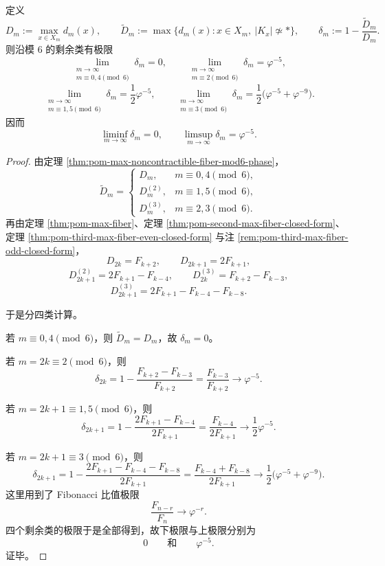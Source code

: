 \begin{theorem}\label{thm:xi-time-part62d-max-noncontractible-fiber-gap-four-constants}
定义
\[
D_m:=\max_{x\in X_m}d_m(x),
\qquad
\widetilde D_m:=\max\{d_m(x):x\in X_m,\ |K_x|\not\simeq *\},
\qquad
\delta_m:=1-\frac{\widetilde D_m}{D_m}.
\]
则沿模 \(6\) 的剩余类有极限
\[
\lim_{\substack{m\to\infty\\ m\equiv 0,4\!\!\!\!\pmod 6}}\delta_m=0,
\qquad
\lim_{\substack{m\to\infty\\ m\equiv 2\!\!\!\!\pmod 6}}\delta_m=\varphi^{-5},
\]
\[
\lim_{\substack{m\to\infty\\ m\equiv 1,5\!\!\!\!\pmod 6}}\delta_m=\frac{1}{2}\varphi^{-5},
\qquad
\lim_{\substack{m\to\infty\\ m\equiv 3\!\!\!\!\pmod 6}}\delta_m=\frac{1}{2}\bigl(\varphi^{-5}+\varphi^{-9}\bigr).
\]
因而
\[
\liminf_{m\to\infty}\delta_m=0,
\qquad
\limsup_{m\to\infty}\delta_m=\varphi^{-5}.
\]
\end{theorem}
\begin{proof}
由定理 \ref{thm:pom-max-noncontractible-fiber-mod6-phase}，
\[
\widetilde D_m=
\begin{cases}
D_m, & m\equiv 0,4\pmod 6,\\[2pt]
D_m^{(2)}, & m\equiv 1,5\pmod 6,\\[2pt]
D_m^{(3)}, & m\equiv 2,3\pmod 6.
\end{cases}
\]
再由定理 \ref{thm:pom-max-fiber}、定理 \ref{thm:pom-second-max-fiber-closed-form}、定理 \ref{thm:pom-third-max-fiber-even-closed-form} 与注 \ref{rem:pom-third-max-fiber-odd-closed-form}，
\[
D_{2k}=F_{k+2},
\qquad
D_{2k+1}=2F_{k+1},
\]
\[
D_{2k+1}^{(2)}=2F_{k+1}-F_{k-4},
\qquad
D_{2k}^{(3)}=F_{k+2}-F_{k-3},
\]
\[
D_{2k+1}^{(3)}=2F_{k+1}-F_{k-4}-F_{k-8}.
\]

于是分四类计算。

若 \(m\equiv 0,4\pmod 6\)，则 \(\widetilde D_m=D_m\)，故 \(\delta_m=0\)。

若 \(m=2k\equiv 2\pmod 6\)，则
\[
\delta_{2k}=1-\frac{F_{k+2}-F_{k-3}}{F_{k+2}}
=\frac{F_{k-3}}{F_{k+2}}
\longrightarrow \varphi^{-5}.
\]

若 \(m=2k+1\equiv 1,5\pmod 6\)，则
\[
\delta_{2k+1}
=1-\frac{2F_{k+1}-F_{k-4}}{2F_{k+1}}
=\frac{F_{k-4}}{2F_{k+1}}
\longrightarrow \frac{1}{2}\varphi^{-5}.
\]

若 \(m=2k+1\equiv 3\pmod 6\)，则
\[
\delta_{2k+1}
=1-\frac{2F_{k+1}-F_{k-4}-F_{k-8}}{2F_{k+1}}
=\frac{F_{k-4}+F_{k-8}}{2F_{k+1}}
\longrightarrow \frac{1}{2}\bigl(\varphi^{-5}+\varphi^{-9}\bigr).
\]
这里用到了 Fibonacci 比值极限
\[
\frac{F_{n-r}}{F_n}\longrightarrow \varphi^{-r}.
\]
四个剩余类的极限于是全部得到，故下极限与上极限分别为
\[
0
\qquad\text{和}\qquad
\varphi^{-5}.
\]
证毕。
\end{proof}

